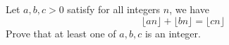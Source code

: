 Let $a,b,c>0$ satisfy for all integers $n$, we have $$\lfloor an\rfloor+\lfloor bn\rfloor=\lfloor cn\rfloor$$Prove that at least one of $a,b,c$ is an integer.